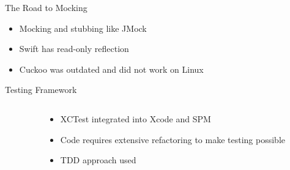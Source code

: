 \documentclass[aspectratio=169]{beamer}
\begin{document}
\begin{frame}{The Road to Mocking}
\begin{center}
    \begin{itemize}
        \item Mocking and stubbing like JMock
        \item Swift has read-only reflection
        \item Cuckoo was outdated and did not work on Linux
    \end{itemize}
\end{center}
\end{frame}

\begin{frame}{Testing Framework}
\begin{columns}
    \begin{column}{0.5\textwidth}
        \inputminted[fontsize=\tiny]{swift}{code/unit-test.flint}
    \end{column}
    \begin{column}{0.5\textwidth}
        \begin{itemize}
            \item XCTest integrated into Xcode and SPM
            \item Code requires extensive refactoring to make testing possible
            \item TDD approach used
        \end{itemize}
    \end{column}
\end{columns}
\end{frame}
\end{document}
